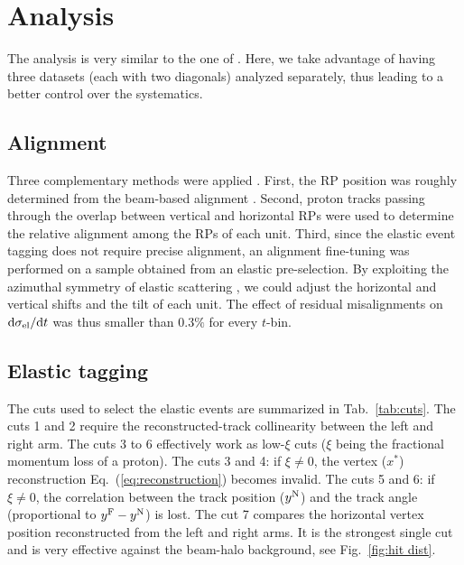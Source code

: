 \documentclass[doublecol]{../macros/epl2}
\def\d{{\rm d}}
\begin{document}
\section{Analysis}

The analysis is very similar to the one of \cite{epl96}. Here, we take advantage of having three datasets (each with two diagonals) analyzed separately, thus leading to a better control over the systematics.


\subsection{Alignment}

Three complementary methods were applied \cite{jan_thesis}. First, the RP position was roughly determined from the beam-based alignment \cite{mario_ipac_2011}. Second, proton tracks passing through the overlap between vertical and horizontal RPs were used to determine the relative alignment among the RPs of each unit. Third, since the elastic event tagging does not require precise alignment, an alignment fine-tuning was performed on a sample obtained from an elastic pre-selection. By exploiting the azimuthal symmetry of elastic scattering%
, we could adjust the horizontal and vertical shifts and the tilt of each unit. The effect of residual misalignments on $\d\sigma_{\rm el}/\d t$ was thus smaller than $0.3\%$ for every $t$-bin.


\subsection{Elastic tagging}

The cuts used to select the elastic events are summarized in Tab.~\ref{tab:cuts}. The cuts 1 and 2 require the reconstructed-track collinearity between the left and right arm. The cuts 3 to 6 effectively work as low-$\xi$ cuts ($\xi$ being the fractional momentum loss of a proton).
The cuts 3 and 4: if $\xi\neq 0$, the vertex ($x^*$) reconstruction Eq.~(\ref{eq:reconstruction}) becomes invalid.
The cuts 5 and 6: if $\xi\neq 0$, the correlation between the track position ($y^{\rm N}$) and the track angle (proportional to $y^{\rm F} - y^{\rm N}$) is lost. The cut 7 compares the horizontal vertex position reconstructed from the left and right arms. It is the strongest single cut and is very effective against the beam-halo background, see Fig.~\ref{fig:hit dist}.
\end{document}
